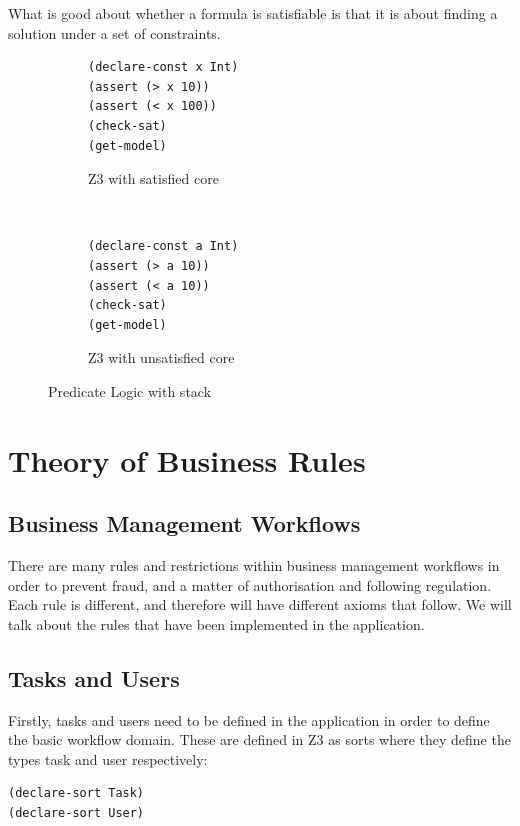 \documentclass[a4paper]{report}
\begin{document}
What is good about whether a formula is satisfiable is that it is about finding a solution under a set of constraints. 
\begin{figure}[!htb]
\centering
\begin{subfigure}[b]{\textwidth}
\lstset{numbers=left, showspaces=false,
    showstringspaces=false, tabsize=2, breaklines=true,
    xleftmargin=5.0ex,
}
\lstset{basicstyle=\ttfamily}
\centering
\begin{lstlisting}[frame=single]
(declare-const x Int)
(assert (> x 10))
(assert (< x 100))
(check-sat)
(get-model)
\end{lstlisting}
\caption{Z3 with satisfied core}
\label{fig:Z3 with satisfied core}
\end{subfigure}\\
\begin{subfigure}[b]{\textwidth}
\lstset{numbers=left, showspaces=false,
    showstringspaces=false, tabsize=2, breaklines=true,
    xleftmargin=5.0ex,
}
\lstset{basicstyle=\ttfamily}
\begin{lstlisting}[frame=single]
(declare-const a Int)
(assert (> a 10))
(assert (< a 10))
(check-sat)
(get-model)
\end{lstlisting}
\caption{Z3 with unsatisfied core}
\label{fig:Z3 with unsatisfied core}
\end{subfigure}
\caption{Predicate Logic with stack}
\label{fig:Predicate Logic with stack}
\end{figure} 

\chapter{Theory of Business Rules}
\section{Business Management Workflows}
There are many rules and restrictions within business management workflows in order to prevent fraud, and a matter of authorisation and following regulation. Each rule is different, and therefore will have different axioms that follow. We will talk about the rules that have been implemented in the application.\\

\section{Tasks and Users}
Firstly, tasks and users need to be defined in the application in order to define the basic workflow domain. These are defined in Z3 as sorts where they define the types task and user respectively:
\lstset{showspaces=false,
    showstringspaces=false, tabsize=2, breaklines=true,
    xleftmargin=5.0ex,
}
\lstset{basicstyle=\ttfamily}
\begin{lstlisting}[frame=single]
(declare-sort Task)
(declare-sort User)
\end{lstlisting}
\end{document}
